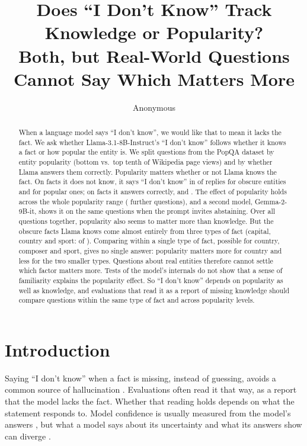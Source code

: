 \documentclass[11pt]{article}
\title{Does ``I Don't Know'' Track Knowledge or Popularity?\\Both, but Real-World Questions Cannot Say Which Matters More}
\author{Anonymous}
\newcommand{\idk}{``I don't know''}
\begin{document}
\maketitle

\begin{abstract}
When a language model says \idk, we would like that to mean it lacks the fact. We ask whether Llama-3.1-8B-Instruct's \idk{} follows whether it knows a fact or how popular the entity is. We split questions from the PopQA dataset by entity popularity (bottom vs.\ top tenth of Wikipedia page views) and by whether Llama answers them correctly. Popularity matters whether or not Llama knows the fact. On facts it does not know, it says \idk{} in \tcObsUnkAbs{} of replies for obscure entities and \tcPopUnkAbs{} for popular ones; on facts it answers correctly, \tcObsKnownAbs{} and \cPopKnownAbs{}. The effect of popularity holds across the whole popularity range (\xtAllN{} further questions), and a second model, Gemma-2-9B-it, shows it on the same questions when the prompt invites abstaining. Over all questions together, popularity also seems to matter more than knowledge. But the obscure facts Llama knows come almost entirely from three types of fact (capital, country and sport: \rcTopThree{} of \gsObsKnownTotal). Comparing within a single type of fact, possible for country, composer and sport, gives no single answer: popularity matters more for country and less for the two smaller types. Questions about real entities therefore cannot settle which factor matters more. Tests of the model's internals do not show that a sense of familiarity explains the popularity effect. So \idk{} depends on popularity as well as knowledge, and evaluations that read it as a report of missing knowledge should compare questions within the same type of fact and across popularity levels.
\end{abstract}

\section{Introduction}

Saying \idk{} when a fact is missing, instead of guessing, avoids a common source of hallucination \citep{kalai2025hallucinate}. Evaluations often read it that way, as a report that the model lacks the fact. Whether that reading holds depends on what the statement responds to. Model confidence is usually measured from the model's answers \citep{kadavath2022know,kuhn2023semantic}, but what a model says about its uncertainty and what its answers show can diverge \citep{ji2025hedging}.
\end{document}

